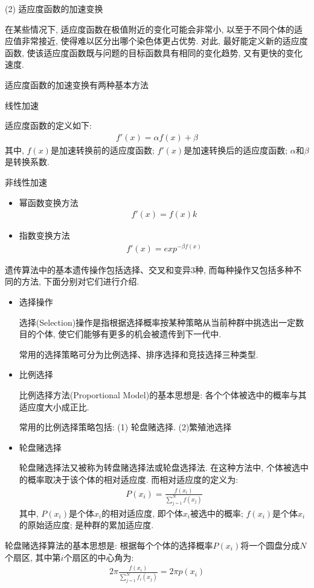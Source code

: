 (2) 适应度函数的加速变换

在某些情况下, 适应度函数在极值附近的变化可能会非常小, 以至于不同个体的适应值非常接近, 使得难以区分出哪个染色体更占优势. 对此, 最好能定义新的适应度函数, 使该适应度函数既与问题的目标函数具有相同的变化趋势, 又有更快的变化速度.

适应度函数的加速变换有两种基本方法

 线性加速

适应度函数的定义如下:
\begin{align}
  f'(x)=\alpha f(x)+\beta
\end{align}
其中, $f(x)$是加速转换前的适应度函数; $f'(x)$是加速转换后的适应度函数;  $\alpha$和$\beta$是转换系数.

      非线性加速
\begin{itemize}
\item 幂函数变换方法
   \begin{align}
     f'(x)=f(x)k
   \end{align}
\item 指数变换方法
         \begin{align}
           f'(x)=exp^{-\beta f(x)}
         \end{align}
\end{itemize}

遗传算法中的基本遗传操作包括选择、交叉和变异3种, 而每种操作又包括多种不同的方法, 下面分别对它们进行介绍.

\begin{itemize}
\item 选择操作

   选择(Selection)操作是指根据选择概率按某种策略从当前种群中挑选出一定数目的个体, 使它们能够有更多的机会被遗传到下一代中.

    常用的选择策略可分为比例选择、排序选择和竞技选择三种类型.

\item 比例选择

    比例选择方法(Proportional Model)的基本思想是: 各个个体被选中的概率与其适应度大小成正比.

    常用的比例选择策略包括: (1) 轮盘赌选择. (2)繁殖池选择

\item 轮盘赌选择

    轮盘赌选择法又被称为转盘赌选择法或轮盘选择法. 在这种方法中, 个体被选中的概率取决于该个体的相对适应度. 而相对适应度的定义为:
\begin{align}
  P\left(x_{i}\right)=\frac{f\left(x_{i}\right)}{\sum_{j=1}^{N} f\left(x_{j}\right)}
\end{align}
其中, $P(x_i)$是个体$x_i$的相对适应度, 即个体$x_i$被选中的概率; $f(x_i)$是个体$x_i$的原始适应度; 是种群的累加适应度.
\end{itemize}
轮盘赌选择算法的基本思想是: 根据每个个体的选择概率$P(x_i)$将一个圆盘分成$N$个扇区, 其中第$i$个扇区的中心角为:
\begin{align}
  2 \pi \frac{f\left(x_{i}\right)}{\sum_{j=1}^{N} f_{i}\left(x_{j}\right)}=2 \pi p\left(x_{i}\right)
\end{align}

